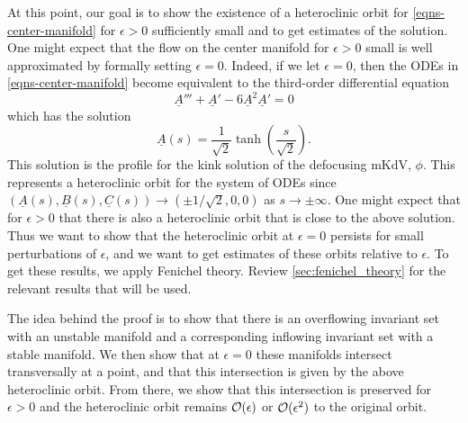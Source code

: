 

At this point, our goal is to show the existence of a heteroclinic orbit for \cref{eqns-center-manifold} for \(\epsilon>0\) sufficiently small and to get estimates of the solution. One might expect that the flow on the center manifold for \(\epsilon>0\) small is well approximated by formally setting \(\epsilon = 0\). Indeed, if we let \(\epsilon = 0\), then the ODEs in \cref{eqns-center-manifold} become equivalent to the third-order differential equation
\begin{equation}
	\underline A ''' + \underline A'  - 6 \underline A^2 \underline A' = 0 
\end{equation}
which has the solution 
\begin{equation}
	\underline A(s) = \frac 1 {\sqrt 2} \tanh\left(\frac s {\sqrt 2}\right).
\end{equation}
This solution is the profile for the kink solution of the defocusing mKdV, \(\phi\). This represents a heteroclinic orbit for the system of ODEs since \((\underline A(s), \underline B(s), \underline C(s)) \to (\pm1/\sqrt 2, 0, 0)\) as \(s\to\pm \infty.\) One might expect that for \(\epsilon > 0\) that there is also a heteroclinic orbit that is close to the above solution. Thus we want to show that the heteroclinic orbit at \(\epsilon = 0\) persists for small perturbations of \(\epsilon\), and we want to get estimates of these orbits relative to \(\epsilon\). To get these results, we apply Fenichel theory. Review \cref{sec:fenichel_theory} for the relevant results that will be used.

The idea behind the proof is to show that there is an overflowing invariant set with an unstable manifold and a corresponding inflowing invariant set with a stable manifold. We then show that at \(\epsilon = 0\) these manifolds intersect transversally at a point, and that this intersection is given by the above heteroclinic orbit. From there, we show that this intersection is preserved for \(\epsilon > 0\) and the heteroclinic orbit remains \(\mathcal{O}(\epsilon)\) or \(\mathcal{O}(\epsilon^2)\) to the original orbit.

